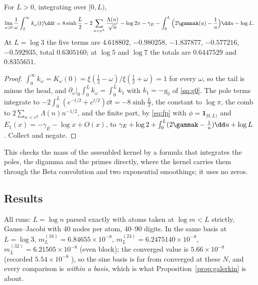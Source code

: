 \begin{proposition}\label{prop:tail}
For $L>0$, integrating over $[0,L)$,
\begin{equation}\label{eq:tail}
 \lim_{\omega\downarrow0}\frac1\omega\int_L^\infty k_\omega(t)\dd t
 =8\sinh\frac L2-2\sum_{n<e^L}\frac{\Lambda(n)}{\sqrt n}-\log2\pi-\gamma_E
 -\int_0^L\Big(2\gammak(u)-\frac1u\Big)\dd u-\log L .
\end{equation}
At $L=\log3$ the five terms are $4.618802$, $-0.980258$, $-1.837877$,
$-0.577216$, $-0.592935$, total $0.6305160$; at $\log5$ and $\log7$ the totals
are $0.6447529$ and $0.8355651$.
\end{proposition}
\begin{proof}
$\int_0^\infty k_\omega=K_\omega(0)=\xi(\frac12-\omega)/\xi(\frac12+\omega)=1$
for every $\omega$, so the tail is minus the head, and
$\partial_\omega|_0\int_0^Lk_\omega=\int_0^Lk_1$ with $k_1=-g_0$ of
\eqref{eq:g0}. The pole terms integrate to
$-2\int_0^L(e^{-t/2}+e^{t/2})\dd t=-8\sinh\frac L2$, the constant to $\log\pi$,
the comb to $2\sum_{n<e^L}\Lambda(n)n^{-1/2}$, and the finite part, by
\eqref{eq:fp} with $\phi=\mathbf 1_{[0,L)}$ and $E_1(x)=-\gamma_E-\log x+O(x)$,
to $\gamma_E+\log2+\int_0^L(2\gammak-\frac1u)\dd u+\log L$. Collect and negate.
\end{proof}

This checks the mass of the assembled kernel by a formula that integrates the
poles, the digamma and the primes directly, where the kernel carries them
through the Beta convolution and two exponential smoothings; it uses no zeros.

\subsection{Results}\label{sec:results}

All runs: $L=\log n$ parsed exactly with atoms taken at $\log m<L$ strictly,
Gauss--Jacobi with 40 nodes per atom, 40--90 digits. In the same basis at
$L=\log3$, $m_L^{(16)}=6.84655\times10^{-8}$, $m_L^{(24)}=6.2475140\times10^{-8}$,
$m_L^{(32)}=6.21505\times10^{-8}$ (even block); the converged value is
$5.66\times10^{-8}$ \cite{FrameBound} (recorded $5.54\times10^{-8}$
\cite{CriticalPath}), so the sine basis is far from converged at these $N$, and
every comparison is \emph{within a basis}, which is what
Proposition~\ref{prop:galerkin} is about.


